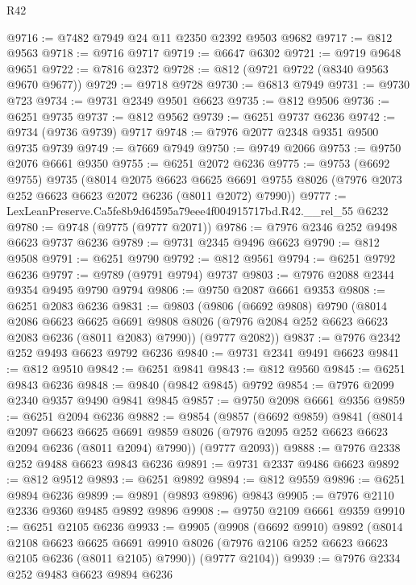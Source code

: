 \begin{lexlean}{R42}
\begin{coremodule}
{@9716 := @7482 @7949 @24 @11 @2350 @2392 @9503 @9682
@9717 := @812 @9563
@9718 := @9716 @9717
@9719 := @6647 @6302
@9721 := @9719 @9648 @9651
@9722 := @7816 @2372
@9728 := @812 (@9721 @9722 (@8340 @9563 @9670 @9677))
@9729 := @9718 @9728
@9730 := @6813 @7949
@9731 := @9730 @723
@9734 := @9731 @2349 @9501 @6623
@9735 := @812 @9506
@9736 := @6251 @9735
@9737 := @812 @9562
@9739 := @6251 @9737 @6236
@9742 := @9734 (@9736 @9739) @9717
@9748 := @7976 @2077 @2348 @9351 @9500 @9735 @9739
@9749 := @7669 @7949
@9750 := @9749 @2066
@9753 := @9750 @2076 @6661 @9350
@9755 := @6251 @2072 @6236
@9775 := @9753
    (@6692 @9755)
    @9735
    (@8014
      @2075
      @6623
      @6625
      @6691
      @9755
      @8026
      (@7976 @2073 @252 @6623 @6623 @2072 @6236 (@8011 @2072) @7990))
@9777 := LexLeanPreserve.Ca5fe8b9d64595a79eee4f004915717bd.R42.__rel_55 @6232
@9780 := @9748 (@9775 (@9777 @2071))
@9786 := @7976 @2346 @252 @9498 @6623 @9737 @6236
@9789 := @9731 @2345 @9496 @6623
@9790 := @812 @9508
@9791 := @6251 @9790
@9792 := @812 @9561
@9794 := @6251 @9792 @6236
@9797 := @9789 (@9791 @9794) @9737
@9803 := @7976 @2088 @2344 @9354 @9495 @9790 @9794
@9806 := @9750 @2087 @6661 @9353
@9808 := @6251 @2083 @6236
@9831 := @9803
    (@9806
      (@6692 @9808)
      @9790
      (@8014
        @2086
        @6623
        @6625
        @6691
        @9808
        @8026
        (@7976 @2084 @252 @6623 @6623 @2083 @6236 (@8011 @2083) @7990))
      (@9777 @2082))
@9837 := @7976 @2342 @252 @9493 @6623 @9792 @6236
@9840 := @9731 @2341 @9491 @6623
@9841 := @812 @9510
@9842 := @6251 @9841
@9843 := @812 @9560
@9845 := @6251 @9843 @6236
@9848 := @9840 (@9842 @9845) @9792
@9854 := @7976 @2099 @2340 @9357 @9490 @9841 @9845
@9857 := @9750 @2098 @6661 @9356
@9859 := @6251 @2094 @6236
@9882 := @9854
    (@9857
      (@6692 @9859)
      @9841
      (@8014
        @2097
        @6623
        @6625
        @6691
        @9859
        @8026
        (@7976 @2095 @252 @6623 @6623 @2094 @6236 (@8011 @2094) @7990))
      (@9777 @2093))
@9888 := @7976 @2338 @252 @9488 @6623 @9843 @6236
@9891 := @9731 @2337 @9486 @6623
@9892 := @812 @9512
@9893 := @6251 @9892
@9894 := @812 @9559
@9896 := @6251 @9894 @6236
@9899 := @9891 (@9893 @9896) @9843
@9905 := @7976 @2110 @2336 @9360 @9485 @9892 @9896
@9908 := @9750 @2109 @6661 @9359
@9910 := @6251 @2105 @6236
@9933 := @9905
    (@9908
      (@6692 @9910)
      @9892
      (@8014
        @2108
        @6623
        @6625
        @6691
        @9910
        @8026
        (@7976 @2106 @252 @6623 @6623 @2105 @6236 (@8011 @2105) @7990))
      (@9777 @2104))
@9939 := @7976 @2334 @252 @9483 @6623 @9894 @6236
}
\end{coremodule}
\end{lexlean}
